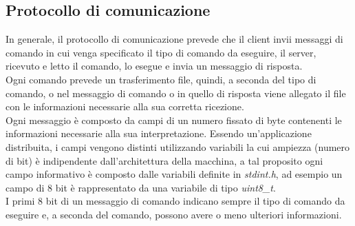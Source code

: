 \subsection{Protocollo di comunicazione}
In generale, il protocollo di comunicazione prevede che il client invii messaggi
di comando in cui venga specificato il tipo di comando da eseguire, il server, 
ricevuto e letto il comando, lo esegue e invia un messaggio di risposta.\\
Ogni comando prevede un trasferimento file, quindi, a seconda del tipo di 
comando, o nel messaggio di comando o in quello di risposta viene allegato il 
file con le informazioni necessarie alla sua corretta ricezione.\\
Ogni messaggio è composto da campi di un numero fissato di byte contenenti le
informazioni necessarie alla sua interpretazione.
Essendo un'applicazione distribuita, i campi vengono distinti utilizzando 
variabili la cui ampiezza (numero di bit) è indipendente dall'architettura 
della macchina, a tal proposito ogni campo informativo è composto dalle 
variabili definite in \emph{stdint.h}, ad esempio un campo di 8 bit è 
rappresentato da una variabile di tipo \emph{uint8\_t}.\\ 
I primi 8 bit di un messaggio di comando indicano sempre il tipo di comando da 
eseguire e, a seconda del comando, possono avere o meno ulteriori informazioni.

